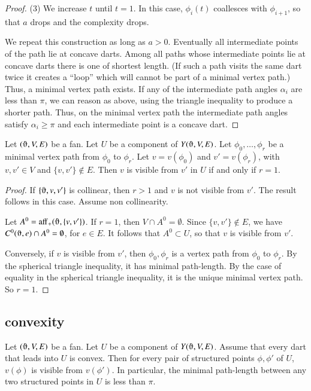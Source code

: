 \begin{proof}
(3) We increase $t$ until $t=1$.  In this case, $\phi_i(t)$ coallesces
with $\phi_{i+1}$, so that $a$ drops and the complexity drops.

We repeat this construction as long as $a>0$.  Eventually all intermediate points of the path lie at concave darts.  Among all paths whose intermediate points lie at concave darts there is one of shortest length.  (If such a path visits the same dart twice it creates a ``loop'' which will cannot be part of a minimal  vertex path.)  Thus, a minimal vertex path exists.  If any of the intermediate path angles $\alpha_i$ are less than $\pi$, we can reason as above, using the triangle inequality to produce a shorter path.
Thus, on the minimal vertex path the intermediate path angles satisfy $\alpha_i\ge \pi$ and each intermediate point is a concave dart.
\end{proof}


\begin{lemma}\label{lemma:visr1}  Let $(\orgn,V,E)$ be a fan. Let $U$ be a component of $Y(\orgn,V,E)$.  Let $\phi_0,\ldots,\phi_r$ be a minimal vertex path from $\phi_0$ to $\phi_r$.  Let $v=v(\phi_0)$ and $v'=v(\phi_r)$, with $v,v'\in V$ and $\{v,v'\}\not\in E$.  Then $v$ is visible from $v'$ in $U$ if and only if $r=1$. 
\end{lemma}

\begin{proof}
If $\{\orgn,v,v'\}$ is collinear, then $r>1$ and $v$ is not visible from $v'$.  The result follows in this case.  Assume non collinearity.  

Let $A^0 = \op{aff}_+(\orgn,\{v,v'\})$.  If $r=1$, then
$V\cap A^0 = \emptyset$.  Since $\{v,v'\}\not\in E$, we have
$C^0(\orgn,e)\cap A^0 = \emptyset$, for $e\in E$.  It follows that
$A^0\subset U$, so that $v$ is visible from $v'$.

Conversely, if $v$ is visible from $v'$, then $\phi_0,\phi_r$ is a vertex path from $\phi_0$ to $\phi_r$.  By the spherical triangle inequality, it has minimal path-length.  By the case of equality in the spherical triangle inequality, it is the unique minimal vertex path.  So $r=1$.
\end{proof}

\subsection{convexity}


\begin{lemma}\label{lemma:convex-vis}
Let $(\orgn,V,E)$ be a fan.  Let $U$ be a component of $Y(\orgn,V,E)$.
Assume that every dart that leads into $U$ is convex.  Then
 for every pair of structured points $\phi,\phi'$ of $U$, 
$v(\phi)$ is visible from $v(\phi')$.
In particular, the minimal path-length between any
two structured points in $U$ is less than $\pi$. 
\end{lemma}

